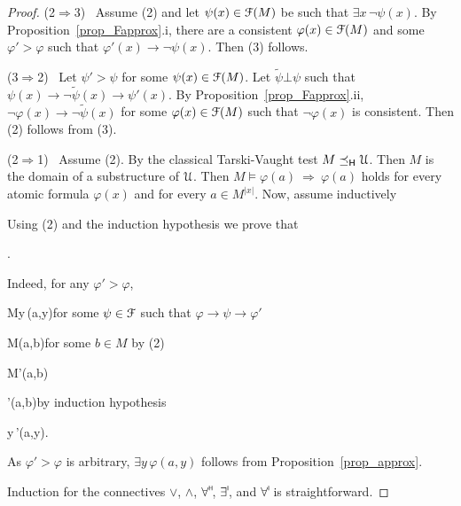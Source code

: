 \documentclass{amsproc}
\begin{document}
{\begin{proof}
  (2$\Rightarrow$3) \ 
  Assume (2) and let $\psi(x)\in{\EuScript F}(M)$ be such that $\exists x\,\neg\psi(x)$.
  By Proposition~\ref{prop_Fapprox}.i, there are a consistent $\varphi(x)\in{\EuScript F}(M)$ and some $\varphi'>\varphi$ such that $\varphi'(x)\rightarrow\neg\psi(x)$.
  Then (3) follows.

  (3$\Rightarrow$2) \ 
  Let $\psi'>\psi$ for some $\psi(x)\in{\EuScript F}(M)$.
  Let $\tilde{\psi}\bot\psi$ such that $\psi(x)\rightarrow\neg\tilde{\psi}(x)\rightarrow\psi'(x)$.
  By Proposition~\ref{prop_Fapprox}.ii, $\neg\varphi(x)\rightarrow\neg\tilde{\psi}(x)$ for some $\varphi(x)\in{\EuScript F}(M)$ such that $\neg\varphi(x)$ is consistent.
  Then (2) follows from (3).
  
  (2$\Rightarrow$1) \ 
  Assume (2).
  By the classical Tarski-Vaught test $M\preceq_{\sf H}{\EuScript U}$.
  Then $M$ is the domain of a substructure of ${\EuScript U}$.
  Then $M\models\varphi(a)\ \Rightarrow\ \varphi(a)$ holds for every atomic formula $\varphi(x)$ and for every $a\in M^{|x|}$.
  Now, assume inductively
  
  \ceq{\hfill M\models\varphi(a,b)}{\Rightarrow}{\varphi(a,b).}

  Using (2) and the induction hypothesis we prove that

  .

  Indeed, for any $\varphi'>\varphi$,

  {\Rightarrow}{M\models\exists y\,\psi(a,y)}\hfill for some $\psi\in{\EuScript F}$ such that $\varphi\rightarrow\psi\rightarrow\varphi'$
  
  \ceq{}
  {\Rightarrow}
  {M\models\psi(a,b)}\hfill for some $b\in M$ by (2)
  
  \ceq{}
  {\Rightarrow}
  {M\models\varphi'(a,b)}
  
  \ceq{}
  {\Rightarrow}
  {\varphi'(a,b)}\hfill by induction hypothesis

  \ceq{}
  {\Rightarrow}
  {\exists y\,\varphi'(a,y).}

  As $\varphi'>\varphi$ is arbitrary, $\exists y\,\varphi(a,y)$ follows from Proposition~\ref{prop_approx}.

  Induction for the connectives $\vee$, $\wedge$, $\forall\raisebox{1.1ex}{\scaleto{\sf H}{.8ex}\kern-.2ex}$, $\exists\raisebox{1.1ex}{\scaleto{\sf I}{.8ex}\kern-.2ex}$, and $\forall\raisebox{1.1ex}{\scaleto{\sf I}{.8ex}\kern-.2ex}$ is straightforward.


\end{proof}}
\end{document}
